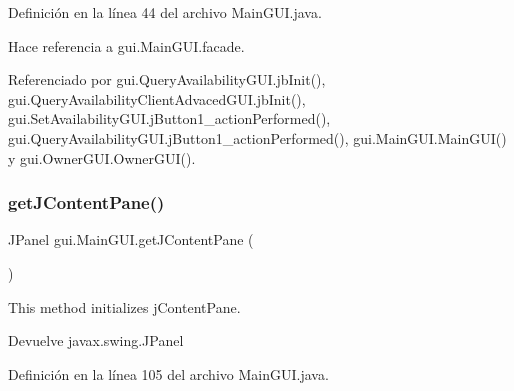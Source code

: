 Definición en la línea 44 del archivo Main\+G\+U\+I.\+java.


\begin{DoxyCode}{0}

\end{DoxyCode}


Hace referencia a gui.\+Main\+G\+U\+I.\+facade.



Referenciado por gui.\+Query\+Availability\+G\+U\+I.\+jb\+Init(), gui.\+Query\+Availability\+Client\+Advaced\+G\+U\+I.\+jb\+Init(), gui.\+Set\+Availability\+G\+U\+I.\+j\+Button1\+\_\+action\+Performed(), gui.\+Query\+Availability\+G\+U\+I.\+j\+Button1\+\_\+action\+Performed(), gui.\+Main\+G\+U\+I.\+Main\+G\+U\+I() y gui.\+Owner\+G\+U\+I.\+Owner\+G\+U\+I().

\mbox{\label{classgui_1_1_main_g_u_i_ae3ce89a59dcf27273ec658ee42cd61b8}} 
\subsubsection{\texorpdfstring{getJContentPane()}{getJContentPane()}}
{\footnotesize\ttfamily J\+Panel gui.\+Main\+G\+U\+I.\+get\+J\+Content\+Pane (\begin{DoxyParamCaption}{ }\end{DoxyParamCaption})\hspace{0.3cm}{\ttfamily [private]}}



This method initializes j\+Content\+Pane. 

\begin{DoxyReturn}{Devuelve}
javax.\+swing.\+J\+Panel 
\end{DoxyReturn}


Definición en la línea 105 del archivo Main\+G\+U\+I.\+java.


